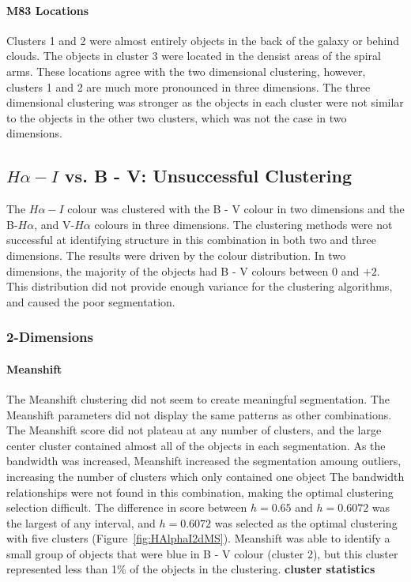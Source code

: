 \paragraph{M83 Locations}
Clusters 1 and 2 were almost entirely objects in the back of the galaxy or behind clouds.
The objects in cluster 3 were located in the densist areas of the spiral arms.
These locations agree with the two dimensional clustering, however, clusters 1 and 2 are much more pronounced in three dimensions.
The three dimensional clustering was stronger as the objects in each cluster were not similar to the objects in the other two clusters, which was not the case in two dimensions.
%
%
%
%
%
%
%
%
%
%
%

\subsection{$H\alpha - I$ vs. B - V: Unsuccessful Clustering}
The $H\alpha - I$ colour was clustered with the B - V colour in two dimensions and the B-$H\alpha$, and V-$H\alpha$ colours in three dimensions.
The clustering methods were not successful at identifying structure in this combination in both two and three dimensions.
The results were driven by the colour distribution.
In two dimensions, the majority of the objects had B - V colours between $0$ and $+2$. 
This distribution did not provide enough variance for the clustering algorithms, and caused the poor segmentation.

\subsubsection{2-Dimensions}

\paragraph{Meanshift}
The Meanshift clustering did not seem to create meaningful segmentation.
The Meanshift parameters did not display the same patterns as other combinations. 
The Meanshift score did not plateau at any number of clusters, and the large center cluster contained almost all of the objects in each segmentation.
As the bandwidth was increased, Meanshift increased the segmentation amoung outliers, increasing the number of clusters which only contained one object
The bandwidth relationships were not found in this combination, making the optimal clustering selection difficult. 
The difference in score between $h=0.65$ and $h=0.6072$ was the largest of any interval, and $h=0.6072$ was selected as the optimal clustering with five clusters (Figure~\ref{fig:HAlphaI2dMS}).
Meanshift was able to identify a small group of objects that were blue in B - V colour (cluster 2), but this cluster represented less than 1\% of the objects in the clustering. 
\textbf{cluster statistics}

